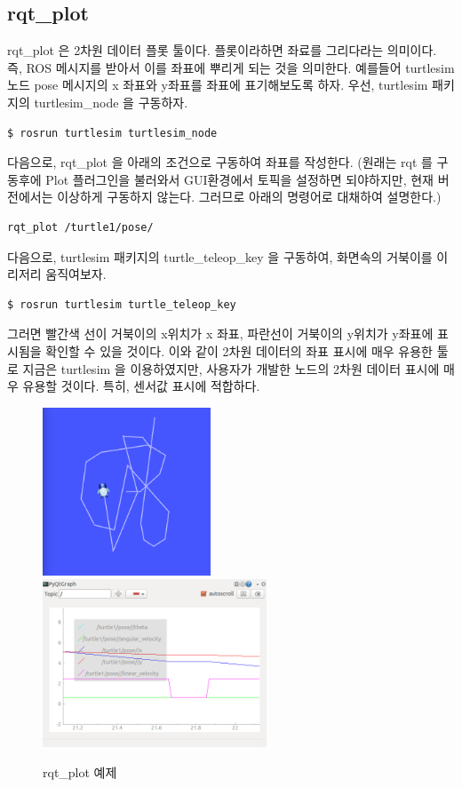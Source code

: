 \subsection{rqt\_plot}

rqt\_plot 은 2차원 데이터 플롯 툴이다. 플롯이라하면 좌료를 그리다라는 의미이다. 즉, ROS 메시지를 받아서 이를 좌표에 뿌리게 되는 것을 의미한다. 예를들어 turtlesim 노드 pose 메시지의 x 좌표와  y좌표를 좌표에 표기해보도록 하자. 우선, turtlesim 패키지의 turtlesim\_node 을 구동하자.

\begin{lstlisting}[language=ros]
$ rosrun turtlesim turtlesim_node 
\end{lstlisting}

다음으로, rqt\_plot 을 아래의 조건으로 구동하여 좌표를 작성한다. (원래는 rqt 를 구동후에 Plot 플러그인을 불러와서 GUI환경에서 토픽을 설정하면 되야하지만, 현재 버전에서는 이상하게 구동하지 않는다. 그러므로 아래의 명령어로 대채하여 설명한다.)

\begin{lstlisting}[language=ros]
rqt_plot /turtle1/pose/
\end{lstlisting}

다음으로, turtlesim 패키지의 turtle\_teleop\_key 을 구동하여, 화면속의 거북이를 이리저리 움직여보자.

\begin{lstlisting}[language=ros]
$ rosrun turtlesim turtle_teleop_key
\end{lstlisting}

그러면 빨간색 선이 거북이의 x위치가 x 좌표, 파란선이 거북이의 y위치가 y좌표에 표시됨을 확인할 수 있을 것이다. 이와 같이 2차원 데이터의 좌표 표시에 매우 유용한 툴로 지금은 turtlesim 을 이용하였지만, 사용자가 개발한 노드의 2차원 데이터 표시에 매우 유용할 것이다. 특히, 센서값 표시에 적합하다.

\begin{figure}[h]
\centering\includegraphics[height=50mm]{pictures/chapter6/turtlesim_rqt_plot1.png}
\centering\includegraphics[height=50mm]{pictures/chapter6/turtlesim_rqt_plot2.png}
\caption{rqt\_plot 예제}
\end{figure}

